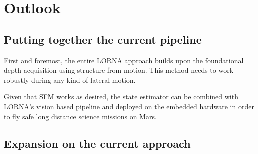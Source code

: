 \chapter{Outlook}
\label{sec:outlook}
\section{Putting together the current pipeline}

First and foremost, the entire LORNA approach builds upon the foundational depth acquisition using structure from motion. This method needs to work robustly during any kind of lateral motion.

Given that SFM works as desired, the state estimator can be combined with LORNA's vision based pipeline and deployed on the embedded hardware in order to fly safe long distance science missions on Mars. 

\section{Expansion on the current approach}

